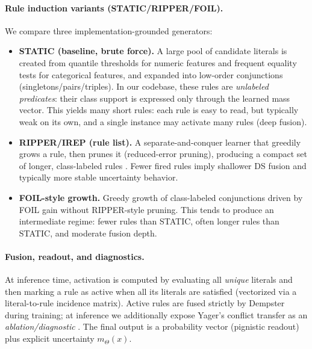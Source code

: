 \documentclass[11pt,a4paper]{article}
\providecommand{\1}{}
\renewcommand{\1}{\mathbbm{1}}
\begin{document}
\paragraph{Rule induction variants (STATIC/RIPPER/FOIL).}
We compare three implementation-grounded generators:
\begin{itemize}
\item \textbf{STATIC (baseline, brute force).} A large pool of candidate literals is created from quantile thresholds for numeric features and frequent equality tests for categorical features, and expanded into low-order conjunctions (singletons/pairs/triples). In our codebase, these rules are \emph{unlabeled predicates}: their class support is expressed only through the learned mass vector. This yields many short rules: each rule is easy to read, but typically weak on its own, and a single instance may activate many rules (deep fusion).
\item \textbf{RIPPER/IREP (rule list).} A separate-and-conquer learner that greedily grows a rule, then prunes it (reduced-error pruning), producing a compact set of longer, class-labeled rules \cite{Cohen1995}. Fewer fired rules imply shallower DS fusion and typically more stable uncertainty behavior.
\item \textbf{FOIL-style growth.} Greedy growth of class-labeled conjunctions driven by FOIL gain \cite{Quinlan1990} without RIPPER-style pruning. This tends to produce an intermediate regime: fewer rules than STATIC, often longer rules than STATIC, and moderate fusion depth.
\end{itemize}

\paragraph{Fusion, readout, and diagnostics.}
At inference time, activation is computed by evaluating all \emph{unique} literals and then marking a rule as active when all its literals are satisfied (vectorized via a literal-to-rule incidence matrix).
Active rules are fused strictly by Dempster during training; at inference we additionally expose Yager's conflict transfer as an \emph{ablation/diagnostic} \cite{Yager1987}.
The final output is a probability vector (pignistic readout) plus explicit uncertainty $m_\Theta(x)$.
\end{document}
